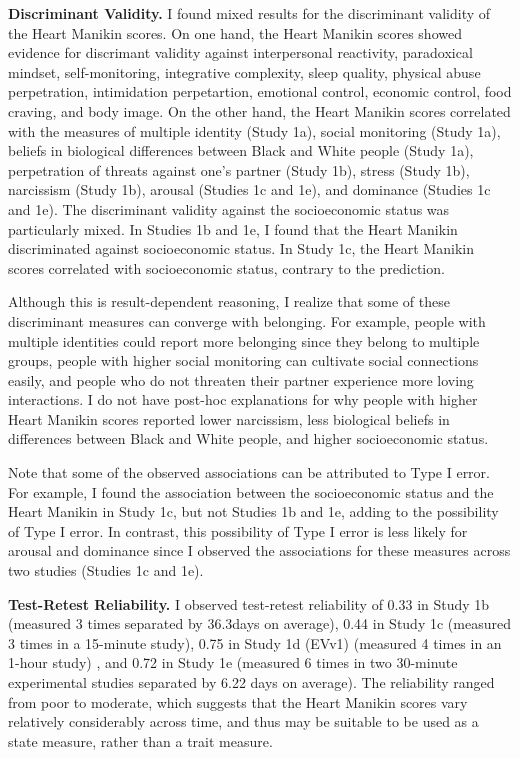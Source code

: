 \documentclass[
]{udthesis}
\begin{document}
\textbf{Discriminant Validity.} I found mixed results for the discriminant
validity of the Heart Manikin scores. On one hand, the Heart Manikin
scores showed evidence for discrimant validity against interpersonal
reactivity, paradoxical mindset, self-monitoring, integrative
complexity, sleep quality, physical abuse perpetration, intimidation
perpetartion, emotional control, economic control, food craving, and
body image. On the other hand, the Heart Manikin scores correlated with
the measures of multiple identity (Study 1a), social monitoring (Study
1a), beliefs in biological differences between Black and White people
(Study 1a), perpetration of threats against one's partner (Study 1b),
stress (Study 1b), narcissism (Study 1b), arousal (Studies 1c and 1e),
and dominance (Studies 1c and 1e). The discriminant validity against the
socioeconomic status was particularly mixed. In Studies 1b and 1e, I
found that the Heart Manikin discriminated against socioeconomic status.
In Study 1c, the Heart Manikin scores correlated with socioeconomic status, contrary to the prediction.

Although this is result-dependent reasoning, I realize that some of
these discriminant measures can converge with belonging. For example,
people with multiple identities could report more belonging since they
belong to multiple groups, people with higher social monitoring can
cultivate social connections easily, and people who do not threaten
their partner experience more loving interactions. I do not have
post-hoc explanations for why people with higher Heart Manikin scores
reported lower narcissism, less biological beliefs in differences
between Black and White people, and higher socioeconomic status.

Note that some of the observed associations can be attributed to Type I
error. For example, I found the association between the
socioeconomic status and the Heart Manikin in Study 1c, but not Studies 1b and 1e,
adding to the possibility of Type I error. In contrast, this possibility
of Type I error is less likely for arousal and dominance since I observed the associations for these
measures across two studies (Studies 1c and 1e).

\textbf{Test-Retest Reliability.} I observed test-retest reliability of
0.33 in Study 1b (measured 3 times separated by
36.3days on average),
0.44 in Study 1c (measured 3 times in a 15-minute
study), 0.75 in Study 1d (EVv1) (measured 4 times
in an 1-hour study) , and 0.72 in Study 1e
(measured 6 times in two 30-minute experimental studies separated by 6.22
days on average). The reliability ranged from poor to moderate, which
suggests that the Heart Manikin scores vary relatively considerably
across time, and thus may be suitable to be used as a state measure,
rather than a trait measure.
\end{document}
